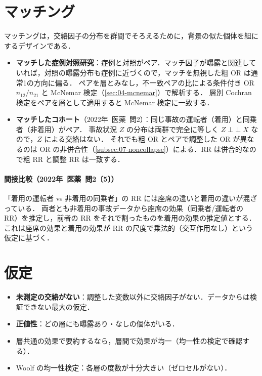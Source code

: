 \documentclass[a4paper,11pt,openany]{ltjsbook}
\newcommand{\tagbox}[2]{\tcbox[on line,boxsep=0.5pt,left=2pt,right=2pt,top=0.5pt,bottom=0.5pt,
  colframe=#1,colback=#1!10,boxrule=0.4pt,arc=1pt]{\scriptsize\bfseries\textcolor{#1}{#2}}}
\newcommand{\Hinshutsu}{\tagbox{bkorange}{頻出}}
\newcommand{\kakomon}[2]{\mbox{#1年 医薬 問#2}}
\newcommand{\indep}{\mathop{\perp\!\!\!\perp}}
\begin{document}
\section{マッチング}\label{sec:07-match}
\Hinshutsu マッチングは，交絡因子の分布を群間でそろえるために，背景の似た個体を組にするデザインである．
\begin{itemize}
\item \textbf{マッチした症例対照研究}：症例と対照がペア．マッチ因子が曝露と関連していれば，対照の曝露分布も症例に近づくので，マッチを無視した粗 OR は通常1の方向に偏る．
      ペアを層とみなし，不一致ペアの比による条件付き OR $n_{12}/n_{21}$ と McNemar 検定（\cref{sec:04-mcnemar}）で解析する．
      層別 Cochran 検定をペアを層として適用すると McNemar 検定に一致する．
\item \textbf{マッチしたコホート}（\kakomon{2022}{2}）：同じ事故の運転者（着用）と同乗者（非着用）がペア．
      事故状況 $Z$ の分布は両群で完全に等しく $Z\indep X$ なので，$Z$ による交絡はない．
      それでも粗 OR とペアで調整した OR が異なるのは OR の非併合性（\cref{subsec:07-noncollapse}）による．RR は併合的なので粗 RR と調整 RR は一致する．
\end{itemize}
\paragraph{間接比較（\kakomon{2022}{2}〔5〕）}
「着用の運転者 vs 非着用の同乗者」の RR には座席の違いと着用の違いが混ざっている．
両者とも非着用の事故データから座席の効果（同乗者/運転者の RR）を推定し，前者の RR をそれで割ったものを着用の効果の推定値とする．
これは座席の効果と着用の効果が RR の尺度で乗法的（交互作用なし）という仮定に基づく．

\section{仮定}\label{sec:07-assump}
\begin{itemize}
\item \textbf{未測定の交絡がない}：調整した変数以外に交絡因子がない．データからは検証できない最大の仮定．
\item \textbf{正値性}：どの層にも曝露あり・なしの個体がいる．
\item 層共通の効果で要約するなら，層間で効果が均一（均一性の検定で確認する）．
\item Woolf の均一性検定：各層の度数が十分大きい（ゼロセルがない）．
\end{itemize}
\end{document}
